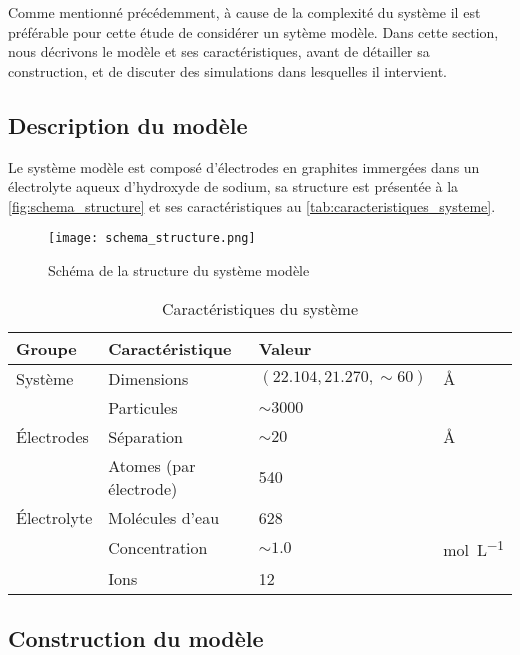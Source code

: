 Comme mentionné précédemment, à cause de la complexité du système il est préférable pour cette étude de considérer un sytème modèle. Dans cette section, nous décrivons le modèle et ses caractéristiques, avant de détailler sa construction, et de discuter des simulations dans lesquelles il intervient.

    \subsection{Description du modèle}

Le système modèle est composé d'électrodes en graphites immergées dans un électrolyte aqueux d'hydroxyde de sodium, sa structure est présentée à la \autoref{fig:schema_structure} et ses caractéristiques au \autoref{tab:caracteristiques_systeme}.

\begin{figure}[h!]
    \centering
    \texttt{[image: schema\_structure.png]}
    \caption{Schéma de la structure du système modèle}
    \label{fig:schema_structure}
\end{figure}

\begin{table}[h!]
    \centering
    \begin{tabular}{l || l | l l}
        \hline
        Groupe &Caractéristique &Valeur &\\
        \hline
        Système &Dimensions &$(22.104, 21.270, \sim 60)$ &\unit{\angstrom}\\
        &Particules &$\sim \num{3000}$ &\\
        \hline
        Électrodes &Séparation &$\sim \num{20}$ &\unit{\angstrom}\\
        &Atomes (par électrode) &\num{540} &\\
        \hline
        Électrolyte &Molécules d'eau &\num{628} &\\
        &Concentration &$\sim \num{1.0}$ &\unit{\mole \per \liter}\\
        &Ions &\num{12} &\\
        \hline
    \end{tabular}
    \caption{Caractéristiques du système}
    \label{tab:caracteristiques_systeme}
\end{table}

    \subsection{Construction du modèle}

